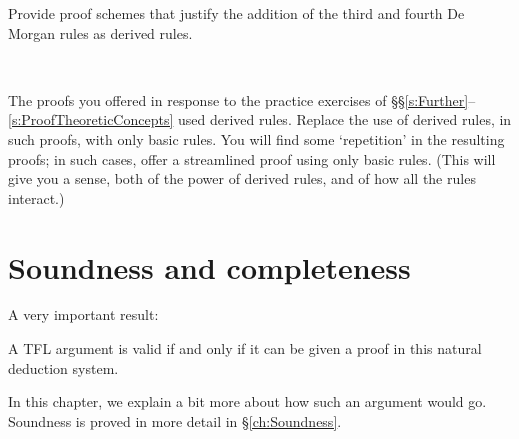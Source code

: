 \begin{practiceproblems}

\problempart
Provide proof schemes that justify the addition of the third and fourth De Morgan rules as derived rules.

\

\problempart
The proofs you offered in response to the practice exercises of \S\S\ref{s:Further}--\ref{s:ProofTheoreticConcepts} used derived rules. Replace the use of derived rules, in such proofs, with only basic rules. You will find some `repetition' in the resulting proofs; in such cases, offer a streamlined proof using only basic rules.  (This will give you a sense, both of the power of derived rules, and of how all the rules interact.)

\end{practiceproblems}

\chapter{Soundness and completeness}
\label{sec:soundness_and_completeness}\nonexaminable

A very important result:
\begin{highlighted}
A TFL argument is valid if and only if it can be given a proof in this natural deduction system.
\end{highlighted}
In this chapter, we explain a bit more about how such an argument would go. Soundness is proved in more detail in \S\ref{ch:Soundness}.

